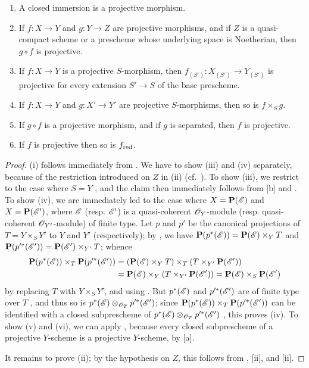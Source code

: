 \begin{prop}[5.5.5]
\label{2.5.5.5}
\medskip\noindent
\begin{enumerate}[label=\emph{(\roman*)}]
  \item A closed immersion is a projective morphism.
  \item If $f:X\to Y$ and $g:Y\to Z$ are projective morphisms, and if $Z$ is a quasi-compact scheme or a prescheme whose underlying space is Noetherian, then $g\circ f$ is projective.
  \item If $f:X\to Y$ is a projective $S$-morphism, then $f_{(S')}:X_{(S')}\to Y_{(S')}$ is projective for every extension $S'\to S$ of the base prescheme.
  \item If $f:X\to Y$ and $g:X'\to Y'$ are projective $S$-morphisms, then so is $f\times_S g$.
  \item If $g\circ f$ is a projective morphism, and if $g$ is separated, then $f$ is projective.
  \item If $f$ is projective then so is $f_{\mathrm{red}}$.
\end{enumerate}
\end{prop}

\begin{proof}
\label{proof-2.5.5.5}
(i) follows immediately from .
We have to show (iii) and (iv) separately, because of the restriction introduced on $Z$ in (ii) (cf.~).
To show (iii), we restrict to the case where $S=Y$ , and the claim then immediately follows from [b] and .
To show (iv), we are immediately led to the case where $X=\mathbf{P}(\mathscr{E})$ and $X=\mathbf{P}(\mathscr{E}')$, where $\mathscr{E}$ (resp. $\mathscr{E}'$) is a quasi-coherent $\mathscr{O}_Y$-module (resp. quasi-coherent $\mathscr{O}_{Y'}$-module) of finite type.
Let $p$ and $p'$ be the canonical projections of $T=Y\times_S Y'$ to $Y$ and $Y'$ (respectively); by , we have $\mathbf{P}(p^*(\mathscr{E})) = \mathbf{P}(\mathscr{E})\times_Y T$ and $\mathbf{P}(p^{\prime *}(\mathscr{E}'))=\mathbf{P}(\mathscr{E}')\times_{Y'}T$; whence
\begin{align*}
  \mathbf{P}(p^*(\mathscr{E}))\times_T\mathbf{P}(p^{\prime *}(\mathscr{E}'))&=(\mathbf{P}(\mathscr{E})\times_Y T)\times_T(T\times_{Y'}\mathbf{P}(\mathscr{E}'))\\
                                              &=\mathbf{P}(\mathscr{E})\times_Y(T\times_{Y'}\mathbf{P}(\mathscr{E}'))=\mathbf{P}(\mathscr{E})\times_S\mathbf{P}(\mathscr{E}')
\end{align*}
by replacing $T$ with $Y\times_S Y'$, and using .
But $p^*(\mathscr{E})$ and $p^{\prime *}(\mathscr{E}')$ are of finite type over $T$ , and thus so is $p^*(\mathscr{E})\otimes_{\mathscr{O}_T}p^{\prime *}(\mathscr{E}')$;
since $\mathbf{P}(p^*(\mathscr{E}))\times_T\mathbf{P}(p^{\prime *}(\mathscr{E}'))$ can be identified with a closed subprescheme of $p^*(\mathscr{E})\otimes_{\mathscr{O}_T}p^{\prime *}(\mathscr{E}')$ , this proves (iv).
To show (v) and (vi), we can apply , because every closed subprescheme of a projective $Y$-scheme is a projective $Y$-scheme, by [a].

It remains to prove (ii); by the hypothesis on $Z$, this follows from , [ii], and [ii].
\end{proof}

